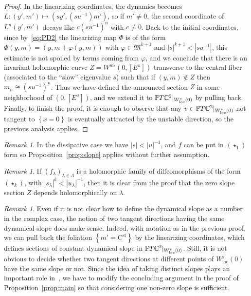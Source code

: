 \documentclass[11pt, oneside]{amsart}
\newcommand{\C}{\mathbb{C}}
\renewcommand{\P}{\mathbb{P}}
\newcommand{\set}[1]{\left\{#1\right\}}
\newcommand{\abs}[1]{\left\vert#1\right\vert}
\newcommand{\rest}[1]{ \arrowvert_{#1}}
\newcommand{\cst}{\mathrm{C}^\mathrm{st}}
\newcommand{\la}{\lambda}
\newcommand{\loc}{{\mathrm{loc}}}
\newcommand{\inv}{^{-1}}
\theoremstyle{remark}
\newtheorem{rmk}[prop]{Remark}
\theoremstyle{definition}
\theoremstyle{theorem}
\newcommand{\commentaire}[1]{}
\begin{document}
\begin{proof}
In the linearizing coordinates,  the dynamics becomes $L:(y', m')\mapsto (sy', (su\inv) m')$, so if 
$m'\neq 0$, the second coordinate  of $L^n(y',m')$ decays like $c(su\inv)^n$ with $c\neq 0$. 
Back to the initial coordinates, since by~\eqref{eq:PD2} the linearizing map 
$\Phi$ is of the form 
$\Phi(y,m) = (y,m+\varphi(y,m))$  with 
$\varphi\in \mathfrak{M}^{k+1}$ and $\abs{s}^{k+1}< \abs{su\inv}$,
this estimate is not spoiled by terms coming from $\varphi$, and  
we conclude  that there is an 
invariant  holomorphic curve $Z= W^{ws}(0, [E^u])$ transverse to the central fiber (associated to the ``slow'' eigenvalue $s$)  such that if 
$(y,m)\notin Z$ then $m_n\cong (su\inv) ^n$. Thus we have defined the announced 
section $Z$  in some neighborhood of $(0, [E^u])$, and we extend it to $\P T\C^2\rest{W^s_\loc(0)}$ 
by pulling back. Finally, to finish the proof, it is enough to observe that 
any $v\in \P T\C^2\rest{W^s_\loc(0)}$ not 
tangent to $\set{x=0}$ is eventually attracted by the unstable direction, so the previous analysis applies. 
\end{proof}
  
\begin{rmk} \commentaire{New remark, cf Exposition remark \#5}
In the dissipative case we have $\abs{s}<\abs{u}\inv$, and $f$ can be put in   $(\star_1)$ form so Proposition~\ref{prop:slope} applies without further assumption. 
\end{rmk}
  
\begin{rmk}\label{rmk:slope_family}\commentaire{New remark for Exposition remark \#3}
If $(f_{\la})_{\la\in \Lambda}$ is a holomorphic family of diffeomorphisms 
of the form $(\star_k)$, with $\abs{s_\lambda}^k<\abs{u_\lambda}\inv$, then 
 it is clear from the proof that the zero slope section $Z$ depends holomorphically on $\lambda$. 
\end{rmk}
  
  
\begin{rmk}\label{rmk:slope2}
Even if it is not clear how to define the dynamical slope as a number in the complex case, 
the notion of two tangent directions  
having the same dynamical slope does make sense. Indeed, with notation as in the previous proof, we can pull back the foliation $\set{m' = \cst}$ by the linearizing coordinates, which   defines sections of constant dynamical slope in $\P T\C^2\rest{W^s_\loc(0)}$. Still, it is not obvious to decide whether two 
tangent directions at different points of $W^s_\loc(0)$ have the same slope or not. Since the idea of taking distinct slopes plays an important role in~\cite{takens}, we have to modify the concluding
  argument  in  the proof of Proposition~\ref{prop:main} so that considering one  non-zero slope is sufficient.   
\end{rmk}
\end{document}
